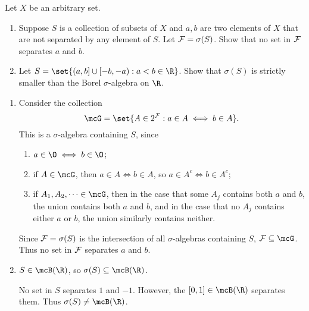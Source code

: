 \documentclass[12pt]{article}
\begin{document}
\begin{problem} \label{prb:separation}
    Let $X$ be an arbitrary set.
    \begin{enumerate}[(1)]
        \item Suppose $S$ is a collection of subsets of $X$ and $a, b$ are
        two elements of $X$ that are not separated by any element of $S$.
        Let $\mathcal F = \sigma(S)$.
        Show that no set in $\mathcal F$ separates $a$ and $b$.
        \item Let $S = \set{(a, b] \cup[-b, -a) : a < b \in \R}$.
        Show that $\sigma(S)$ is strictly smaller than the Borel
        $\sigma$-algebra on $\R$.
    \end{enumerate}
\end{problem}
\begin{solution} \leavevmode
    \begin{enumerate}[(1)]
        \item Consider the collection \[
            \mcG = \set{A \in 2^\F : a \in A \iff b \in A}.
        \] This is a $\sigma$-algebra containing $S$, since
        \begin{enumerate}
            \item $a \in \O \iff b \in \O$;
            \item if $A \in \mcG$, then $a \in A \iff b \in A$,
                so $a \in A^c \iff b \in A^c$;
            \item if $A_1, A_2, \dots \in \mcG$, then in the case that some
            $A_j$ contains both $a$ and $b$,
            the union contains both $a$ and $b$, and in the case that no
            $A_j$ contains either $a$ or $b$,
            the union similarly contains neither.
        \end{enumerate}
        Since $\mathcal F = \sigma(S)$ is the intersection of all $\sigma$-algebras
        containing $S$, $\F \subseteq \mcG$.
        Thus no set in $\mathcal F$ separates $a$ and $b$.
        \item $S \in \mcB(\R)$, so $\sigma(S) \subseteq \mcB(\R)$.

        No set in $S$ separates $1$ and $-1$.
        However, the $[0, 1] \in \mcB(\R)$ separates them.
        Thus $\sigma(S) \ne \mcB(\R)$. \qedhere
    \end{enumerate}
\end{solution}
\end{document}
